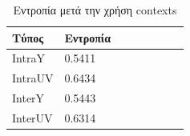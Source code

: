\begin{table}[h!]
    \begin{center}
        \begin{tabular}{| l | l | l | l | l | l | l | l |}
        \hline
        Τύπος    & Εντροπία \\ \hline
        IntraY   & 0.5411   \\ \hline
        IntraUV  & 0.6434   \\ \hline
        InterY   & 0.5443   \\ \hline
        InterUV  & 0.6314   \\ \hline
        \hline
        \end{tabular}
    \end{center}
    \caption{Εντροπία μετά την χρήση contexts}
    \label{table:conentropy}
\end{table} 